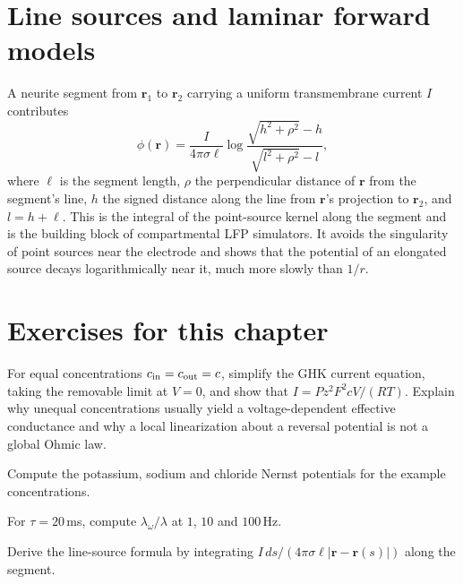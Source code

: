 \section{Line sources and laminar forward models}
A neurite segment from $\mathbf r_1$ to $\mathbf r_2$ carrying a
uniform transmembrane current $I$ contributes
\[
\phi(\mathbf r)=\frac{I}{4\pi\sigma\ell}\log\frac{\sqrt{h^2+\rho^2}-h}{\sqrt{l^2+\rho^2}-l},
\]
where $\ell$ is the segment length, $\rho$ the perpendicular distance of
$\mathbf r$ from the segment's line, $h$ the signed distance along the
line from $\mathbf r$'s projection to $\mathbf r_2$, and $l=h+\ell$. This
is the integral of the point-source kernel along the segment and is the
building block of compartmental LFP simulators. It avoids the
singularity of point sources near the electrode and shows that the
potential of an elongated source decays logarithmically near it, much
more slowly than $1/r$.

\section*{Exercises for this chapter}
\begin{exercise}
For equal concentrations $c_{\rm in}=c_{\rm out}=c$, simplify the
GHK current equation, taking the removable limit at $V=0$, and show
that $I=Pz^2F^2cV/(RT)$. Explain why unequal concentrations
usually yield a voltage-dependent effective conductance and why a
local linearization about a reversal potential is not a global Ohmic law.
\end{exercise}
\begin{exercise}
Compute the potassium, sodium and chloride Nernst potentials for the
example concentrations.
\end{exercise}
\begin{exercise}
For $\tau=20$\,ms, compute $\lambda_\omega/\lambda$ at $1$, $10$ and
$100$\,Hz.
\end{exercise}
\begin{exercise}
Derive the line-source formula by integrating
$I\,ds/(4\pi\sigma\ell|\mathbf r-\mathbf r(s)|)$ along the segment.
\end{exercise}
